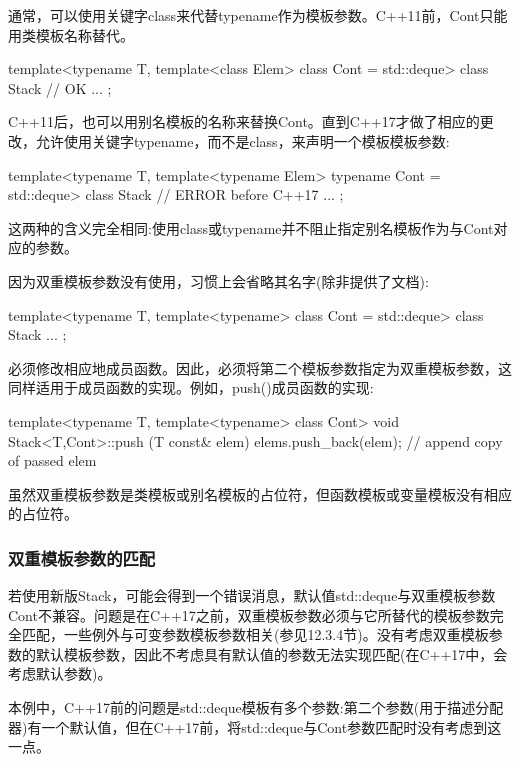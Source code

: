 通常，可以使用关键字class来代替typename作为模板参数。C++11前，Cont只能用类模板名称替代。

\begin{cpp}
template<typename T,
		template<class Elem> class Cont = std::deque>
class Stack { // OK
	...
};
\end{cpp}

C++11后，也可以用别名模板的名称来替换Cont。直到C++17才做了相应的更改，允许使用关键字typename，而不是class，来声明一个模板模板参数:

\begin{cpp}
template<typename T,
		template<typename Elem> typename Cont = std::deque>
class Stack { // ERROR before C++17
	...
};
\end{cpp}

这两种的含义完全相同:使用class或typename并不阻止指定别名模板作为与Cont对应的参数。

因为双重模板参数没有使用，习惯上会省略其名字(除非提供了文档):

\begin{cpp}
template<typename T,
		template<typename> class Cont = std::deque>
class Stack {
	...
};
\end{cpp}

必须修改相应地成员函数。因此，必须将第二个模板参数指定为双重模板参数，这同样适用于成员函数的实现。例如，push()成员函数的实现:

\begin{cpp}
template<typename T, template<typename> class Cont>
void Stack<T,Cont>::push (T const& elem)
{
	elems.push_back(elem); // append copy of passed elem
}
\end{cpp}

虽然双重模板参数是类模板或别名模板的占位符，但函数模板或变量模板没有相应的占位符。

\subsubsection{双重模板参数的匹配}

若使用新版Stack，可能会得到一个错误消息，默认值std::deque与双重模板参数Cont不兼容。问题是在C++17之前，双重模板参数必须与它所替代的模板参数完全匹配，一些例外与可变参数模板参数相关(参见12.3.4节)。没有考虑双重模板参数的默认模板参数，因此不考虑具有默认值的参数无法实现匹配(在C++17中，会考虑默认参数)。

本例中，C++17前的问题是std::deque模板有多个参数:第二个参数(用于描述分配器)有一个默认值，但在C++17前，将std::deque与Cont参数匹配时没有考虑到这一点。

